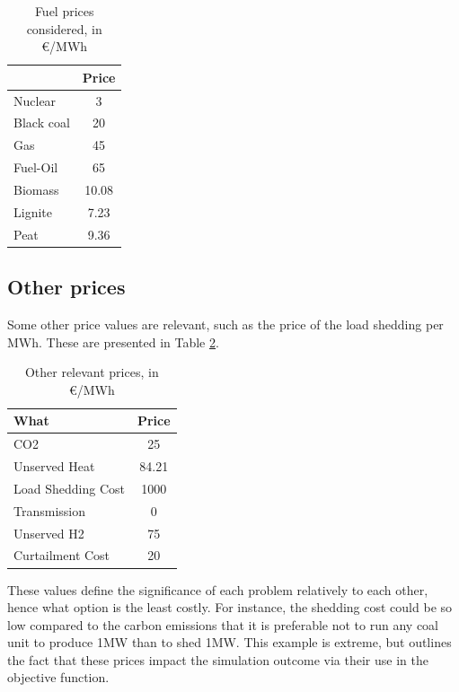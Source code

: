 \begin{table}[h]
    \centering
	\begin{tabular}{|l c|}
		\hline
		& Price \\
		\hline
		Nuclear    & 3 \\
		Black coal & 20 \\
		Gas        & 45 \\
		Fuel-Oil   & 65\\
		Biomass    & 10.08\\
		Lignite    & 7.23\\
		Peat       & 9.36 \\
		\hline
	\end{tabular}
	\caption{Fuel prices considered, in €/MWh}
	\label{table:fuel-prices}
\end{table}

\subsection{Other prices}

Some other price values are relevant, such as the price of the load shedding per MWh. These are presented in Table \ref{table:other-prices}.

\begin{table}[h]
    \centering
	\begin{tabular}{|l c|}
		\hline
		What & Price \\
		\hline
		CO2                & 25 \\
		Unserved Heat      & 84.21\\
		Load Shedding Cost & 1000\\
		Transmission       & 0\\
		Unserved H2        & 75\\
		Curtailment Cost   & 20 \\
		\hline
	\end{tabular}
	\caption{Other relevant prices, in €/MWh}
	\label{table:other-prices}
\end{table}


These values define the significance of each problem relatively to each other, hence what option is the least costly. For instance, the shedding cost could be so low compared to the carbon emissions that it is preferable not to run any coal unit to produce 1MW than to shed 1MW. This example is extreme, but outlines the fact that these prices impact the simulation outcome via their use in the objective function.

